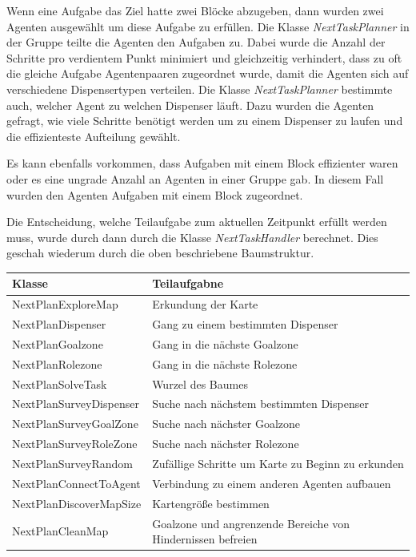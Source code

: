 Wenn eine Aufgabe das Ziel hatte zwei Blöcke abzugeben, dann wurden zwei Agenten ausgewählt um diese Aufgabe zu erfüllen. Die Klasse \textit{NextTaskPlanner} in der Gruppe teilte die Agenten den Aufgaben zu. Dabei wurde die Anzahl der Schritte pro verdientem Punkt minimiert und gleichzeitig verhindert, dass zu oft die gleiche Aufgabe Agentenpaaren zugeordnet wurde, damit die Agenten sich auf verschiedene Dispensertypen verteilen. Die Klasse \textit{NextTaskPlanner} bestimmte auch, welcher Agent zu welchen Dispenser läuft. Dazu wurden die Agenten gefragt, wie viele Schritte benötigt werden um zu einem Dispenser zu laufen und die  effizienteste Aufteilung gewählt.

Es kann ebenfalls vorkommen, dass Aufgaben mit einem Block effizienter waren oder es eine ungrade Anzahl an Agenten in einer Gruppe gab. In diesem Fall wurden den Agenten Aufgaben mit einem Block zugeordnet.

Die Entscheidung, welche Teilaufgabe zum aktuellen Zeitpunkt erfüllt werden muss, wurde durch dann durch die Klasse \textit{NextTaskHandler} berechnet. Dies geschah wiederum durch die oben beschriebene Baumstruktur. \\

\begin{tabular}{l | p{6cm}}\label{Liste der Pläne}
Klasse & Teilaufgabne \\
\hline
NextPlanExploreMap & Erkundung der Karte\\
NextPlanDispenser & Gang zu einem bestimmten Dispenser\\
NextPlanGoalzone & Gang in die nächste Goalzone\\
NextPlanRolezone & Gang in die nächste Rolezone\\
NextPlanSolveTask & Wurzel des Baumes\\
NextPlanSurveyDispenser & Suche nach nächstem bestimmten Dispenser\\
NextPlanSurveyGoalZone & Suche nach nächster Goalzone\\
NextPlanSurveyRoleZone & Suche nach nächster Rolezone\\
NextPlanSurveyRandom & Zufällige Schritte um Karte zu Beginn zu erkunden\\
NextPlanConnectToAgent & Verbindung zu einem anderen Agenten aufbauen\\
NextPlanDiscoverMapSize & Kartengröße bestimmen\\
NextPlanCleanMap & Goalzone und angrenzende Bereiche von Hindernissen befreien\\
\end{tabular}

